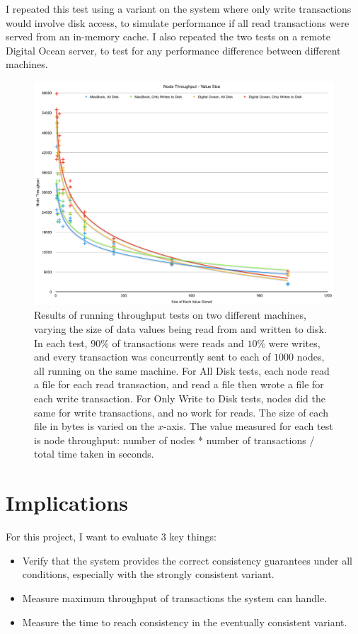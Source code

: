 \documentclass[12pt,a4paper]{article}
\begin{document}
I repeated this test using a variant on the system where only write transactions would involve disk access, to simulate performance if all read transactions were served from an in-memory cache. I also repeated the two tests on a remote Digital Ocean server, to test for any performance difference between different machines.

\begin{figure}
  \centering
    \includegraphics[width=1\textwidth]{figure}
  \caption{Results of running throughput tests on two different machines, varying the size of data values being read from and written to disk. In each test, $90\%$ of transactions were reads and $10\%$ were writes, and every transaction was concurrently sent to each of $1000$ nodes, all running on the same machine. For All Disk tests, each node read a file for each read transaction, and read a file then wrote a file for each write transaction. For Only Write to Disk tests, nodes did the same for write transactions, and no work for reads. The size of each file in bytes is varied on the $x$-axis. The value measured for each test is node throughput: number of nodes * number of transactions / total time taken in seconds.}
\end{figure}

\section*{Implications}

For this project, I want to evaluate 3 key things:

\begin{itemize}
  \item
  Verify that the system provides the correct consistency guarantees under all conditions, especially with the strongly consistent variant.

  \item
  Measure maximum throughput of transactions the system can handle.

  \item
  Measure the time to reach consistency in the eventually consistent variant.

\end{itemize}
\end{document}
